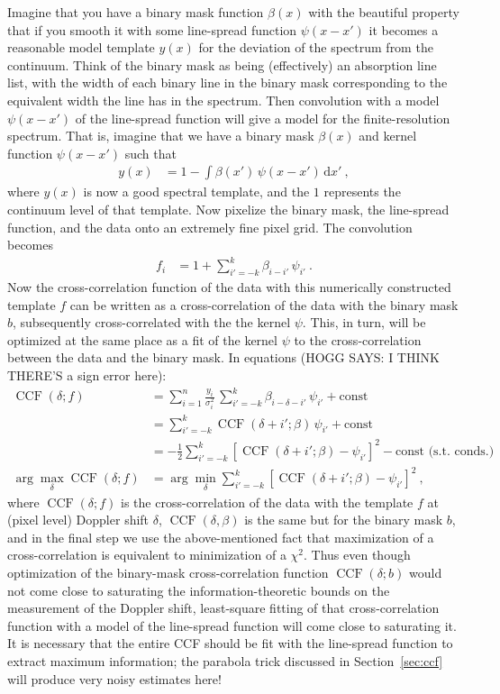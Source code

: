 \documentclass[modern]{aastex631}
\DeclareMathOperator{\CCF}{CCF}
\newcommand{\dd}{\mathrm{d}}
\newcommand{\sectionname}{Section}
\newcommand{\secref}[1]{\sectionname~\ref{#1}}
\begin{document}
Imagine that you have a binary mask function $\beta(x)$ with the beautiful property that if you smooth it with some line-spread function $\psi(x-x')$ it becomes a reasonable model template $y(x)$ for the deviation of the spectrum from the continuum.
Think of the binary mask as being (effectively) an absorption line list, with the width of each binary line in the binary mask corresponding to the equivalent width the line has in the spectrum.
Then convolution with a model $\psi(x-x')$ of the line-spread function will give a model for the finite-resolution spectrum.
That is, imagine that we have a binary mask $\beta(x)$ and kernel function $\psi(x-x')$ such that
\begin{align}
    y(x) &= 1 - \int\beta(x')\,\psi(x-x')\,\dd x' ~,
\end{align}
where $y(x)$ is now a good spectral template, and the $1$ represents the continuum level of that template.
Now pixelize the binary mask, the line-spread function, and the data onto an extremely fine pixel grid.
The convolution becomes
\begin{align}
    f_i &= 1 + \sum_{i'=-k}^k \beta_{i-i'}\,\psi_{i'} ~.
\end{align}
Now the cross-correlation function of the data with this numerically constructed template $f$ can be written as a cross-correlation of the data with the binary mask $b$, subsequently cross-correlated with the the kernel $\psi$.
This, in turn, will be optimized at the same place as a fit of the kernel $\psi$ to the cross-correlation between the data and the binary mask.
In equations (HOGG SAYS: I THINK THERE'S a sign error here):
\begin{align}
    \CCF(\delta; f) &= \sum_{i=1}^n \frac{y_i}{\sigma_i^2}\,\sum_{i'=-k}^k \beta_{i-\delta-i'}\,\psi_{i'} + \text{const}\\
    &= \sum_{i'=-k}^k \CCF(\delta+i';\beta)\,\psi_{i'} + \text{const}\\
    &= -\frac{1}{2}\sum_{i'=-k}^k [\CCF(\delta+i';\beta) - \psi_{i'}]^2 - \text{const}\mbox{~(s.t. conds.)}\\
    \arg\max_{\delta} \CCF(\delta; f) &= \arg\min_{\delta} \sum_{i'=-k}^k [\CCF(\delta+i';\beta) - \psi_{i'}]^2 ~,
\end{align}
where $\CCF(\delta; f)$ is the cross-correlation of the data with the template $f$ at (pixel level) Doppler shift $\delta$,
$\CCF(\delta, \beta)$ is the same but for the binary mask $b$,
and in the final step we use the above-mentioned fact that maximization of a cross-correlation is equivalent to minimization of a $\chi^2$.
Thus even though optimization of the binary-mask cross-correlation function $\CCF(\delta; b)$ would not come close to saturating the information-theoretic bounds on the measurement of the Doppler shift, least-square fitting of that cross-correlation function with a model of the line-spread function will come close to saturating it. 
It is necessary that the entire CCF should be fit with the line-spread function to extract maximum information; the parabola trick discussed in \secref{sec:ccf} will produce very noisy estimates here!
\end{document}
